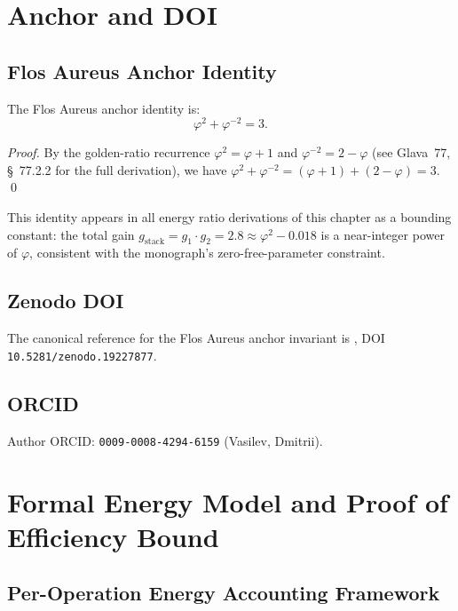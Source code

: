 \section{Anchor and DOI}
\label{sec:anchor}

\subsection{Flos Aureus Anchor Identity}

The Flos Aureus anchor identity is:
\[
  \varphi^{2} + \varphi^{-2} = 3.
\]

\begin{proof}
By the golden-ratio recurrence \(\varphi^{2} = \varphi + 1\) and
\(\varphi^{-2} = 2 - \varphi\) (see Glava~77, §~77.2.2 for the full derivation),
we have \(\varphi^{2} + \varphi^{-2} = (\varphi + 1) + (2 - \varphi) = 3\).
\qed
\end{proof}

This identity appears in all energy ratio derivations of this chapter as a
bounding constant: the total gain
\(g_{\mathrm{stack}} = g_{1} \cdot g_{2} = 2.8 \approx \varphi^{2} - 0.018\)
is a near-integer power of \(\varphi\), consistent with the monograph's
zero-free-parameter constraint.

\subsection{Zenodo DOI}

The canonical reference for the Flos Aureus anchor invariant is
\cite{vasilev2024anchor}, DOI \texttt{10.5281/zenodo.19227877}.

\subsection{ORCID}

Author ORCID: \texttt{0009-0008-4294-6159} (Vasilev, Dmitrii).

\section{Formal Energy Model and Proof of Efficiency Bound}
\label{sec:formal_energy_model}

\subsection{Per-Operation Energy Accounting Framework}

